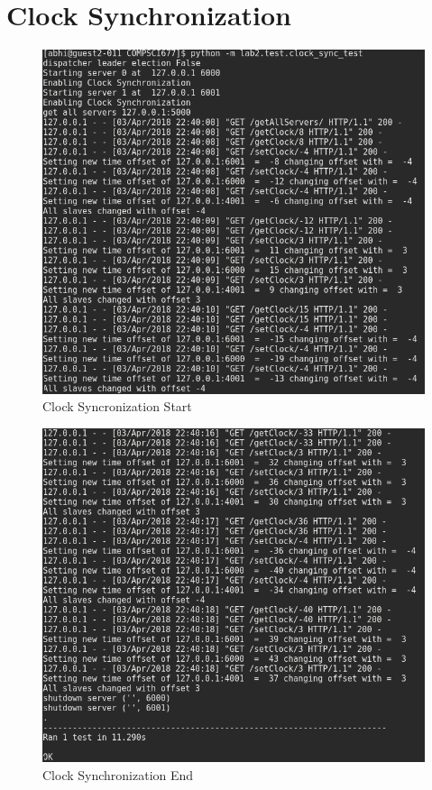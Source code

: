 \documentclass{article}
\begin{document}
\section{Clock Synchronization}
\begin{figure}[H]
        \centering
        \includegraphics[width=\textwidth]{outputs/clock_sync_test_start.png}
        \caption{Clock Syncronization Start}
\end{figure}
\begin{figure}[H]
        \centering
        \includegraphics[width=\textwidth]{outputs/clock_sync_test_end.png}
        \caption{Clock Synchronization End}
\end{figure}
\end{document}
